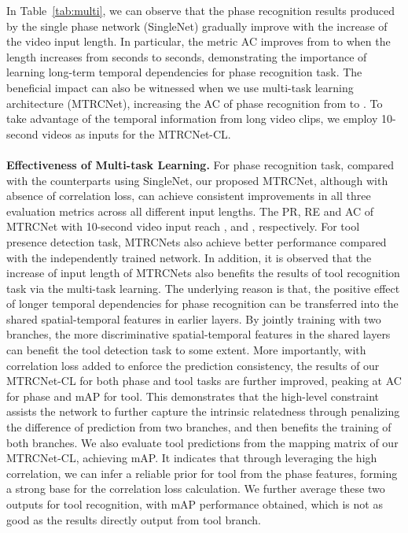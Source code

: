 \documentclass{elsarticle}
\begin{document}
In Table~\ref{tab:multi}, we can observe that the phase recognition results produced by the single phase network (SingleNet) gradually improve with the increase of the video input length.
In particular, the metric AC improves from  to  when the length increases from  seconds to  seconds,
demonstrating the importance of learning long-term temporal dependencies for phase recognition task.
The beneficial impact can also be witnessed when we use multi-task learning architecture (MTRCNet), increasing the AC of phase recognition from  to .
To take advantage of the temporal information from long video clips, we employ 10-second videos as inputs for the MTRCNet-CL.
\\
\\
\textbf{Effectiveness of Multi-task Learning.}
For phase recognition task, compared with the counterparts using SingleNet, our proposed MTRCNet, although with absence of correlation loss, can achieve consistent improvements in all three evaluation metrics across all different input lengths.
The PR, RE and AC of MTRCNet with 10-second video input reach ,  and , respectively.
For tool presence detection task, MTRCNets also achieve better performance compared with the independently trained network.
In addition, it is observed that the increase of input length of MTRCNets also benefits the results of tool recognition task via the multi-task learning.
The underlying reason is that, the positive effect of longer temporal dependencies for phase recognition can be transferred into the shared  spatial-temporal features in earlier layers. 
By jointly training with two branches, the more discriminative spatial-temporal features in the shared layers can benefit the tool detection task to some extent. 
More importantly, with correlation loss added to enforce the prediction consistency, the results of our MTRCNet-CL for both phase and tool tasks are further improved, peaking at  AC for phase and  mAP for tool.
This demonstrates that the high-level constraint assists the network to further capture the intrinsic relatedness through penalizing the difference of prediction from two branches, and then benefits the training of both branches.
We also evaluate tool predictions from the mapping matrix of our MTRCNet-CL, achieving  mAP.
It indicates that through leveraging the high correlation, we can infer a reliable prior for tool from the phase features, forming a strong base for the correlation loss calculation.
We further average these two outputs for tool recognition, with  mAP performance obtained, which is not as good as the results directly output from tool branch.
\end{document}
